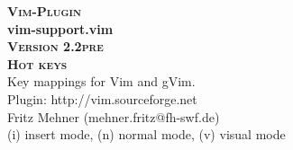 \documentclass[oneside,10pt,landscape,DIV16]{scrartcl}
\newcommand{\Pluginversion}{2.2pre}
\begin{document}
%

\begin{multicols}{3}
%
\begin{center}
%
\textbf{\textsc{\small{Vim-Plugin}}}\\
\textbf{\LARGE{vim-support.vim}}\\
\textbf{\textsc{\small{Version \Pluginversion}}}\\
\vspace{5mm}%
\textbf{\textsc{\Huge{Hot keys}}}\\ 
\vspace{5mm}%
Key mappings for Vim and gVim.\\
Plugin: http://vim.sourceforge.net\\
Fritz Mehner (mehner.fritz@fh-swf.de)\\
\vspace{1.0mm}
{\normalsize (i)} insert mode, {\normalsize (n)} normal mode, {\normalsize (v)} visual mode\\
\vspace{4.0mm}


\end{center}
\end{multicols}
\end{document}
